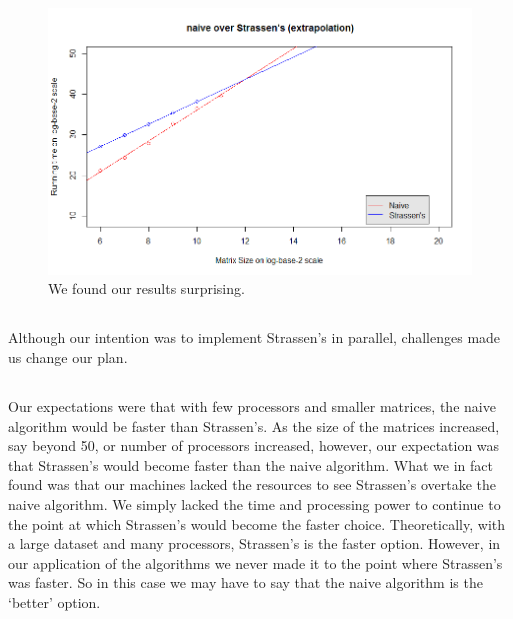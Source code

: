 \documentclass[11pt,twocolumn]{article}
\begin{document}
\subsection{} 
\begin{figure}[h!]
\includegraphics[scale=.35]{graph.png}
  		\caption{We found our results surprising.}
\end{figure}

\subsection{}
Although our intention was to implement Strassen's in parallel, challenges made us
change our plan.

\subsection{}
Our expectations were that with few processors and smaller matrices, the naive algorithm 
would be faster than Strassen’s. As the size of the matrices increased, say beyond 50, or 
number of processors increased, however, our expectation was that Strassen’s would become 
faster than the naive algorithm. What we in fact found was that our machines lacked the 
resources to see Strassen’s overtake the naive algorithm. We simply lacked the time and 
processing power to continue to the point at which Strassen’s would become the faster 
choice. Theoretically, with a large dataset and many processors, Strassen’s is the faster 
option. However, in our application of the algorithms we never made it to the point where 
Strassen’s was faster. So in this case we may have to say that the naive algorithm is 
the ‘better’ option.
\end{document}
